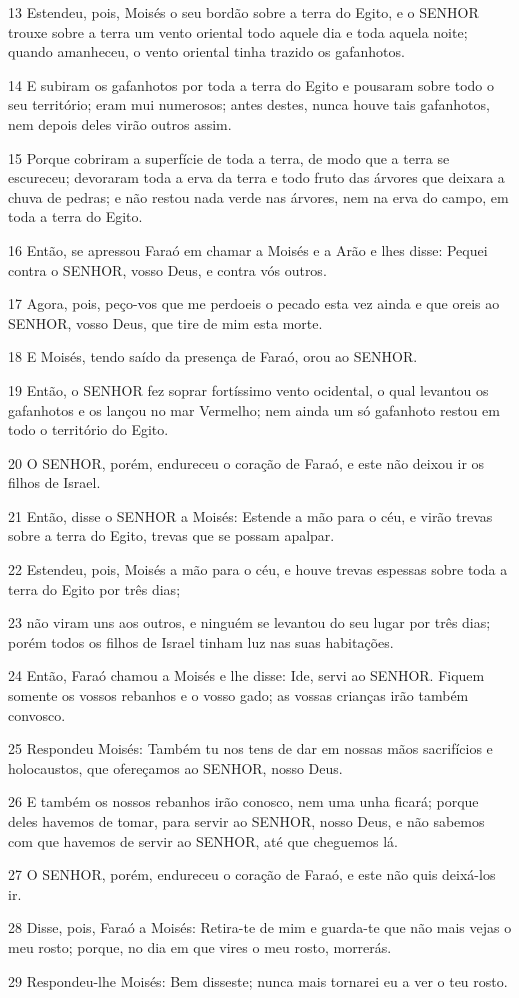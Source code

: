 \par 13 Estendeu, pois, Moisés o seu bordão sobre a terra do Egito, e o SENHOR trouxe sobre a terra um vento oriental todo aquele dia e toda aquela noite; quando amanheceu, o vento oriental tinha trazido os gafanhotos.
\par 14 E subiram os gafanhotos por toda a terra do Egito e pousaram sobre todo o seu território; eram mui numerosos; antes destes, nunca houve tais gafanhotos, nem depois deles virão outros assim.
\par 15 Porque cobriram a superfície de toda a terra, de modo que a terra se escureceu; devoraram toda a erva da terra e todo fruto das árvores que deixara a chuva de pedras; e não restou nada verde nas árvores, nem na erva do campo, em toda a terra do Egito.
\par 16 Então, se apressou Faraó em chamar a Moisés e a Arão e lhes disse: Pequei contra o SENHOR, vosso Deus, e contra vós outros.
\par 17 Agora, pois, peço-vos que me perdoeis o pecado esta vez ainda e que oreis ao SENHOR, vosso Deus, que tire de mim esta morte.
\par 18 E Moisés, tendo saído da presença de Faraó, orou ao SENHOR.
\par 19 Então, o SENHOR fez soprar fortíssimo vento ocidental, o qual levantou os gafanhotos e os lançou no mar Vermelho; nem ainda um só gafanhoto restou em todo o território do Egito.
\par 20 O SENHOR, porém, endureceu o coração de Faraó, e este não deixou ir os filhos de Israel.
\par 21 Então, disse o SENHOR a Moisés: Estende a mão para o céu, e virão trevas sobre a terra do Egito, trevas que se possam apalpar.
\par 22 Estendeu, pois, Moisés a mão para o céu, e houve trevas espessas sobre toda a terra do Egito por três dias;
\par 23 não viram uns aos outros, e ninguém se levantou do seu lugar por três dias; porém todos os filhos de Israel tinham luz nas suas habitações.
\par 24 Então, Faraó chamou a Moisés e lhe disse: Ide, servi ao SENHOR. Fiquem somente os vossos rebanhos e o vosso gado; as vossas crianças irão também convosco.
\par 25 Respondeu Moisés: Também tu nos tens de dar em nossas mãos sacrifícios e holocaustos, que ofereçamos ao SENHOR, nosso Deus.
\par 26 E também os nossos rebanhos irão conosco, nem uma unha ficará; porque deles havemos de tomar, para servir ao SENHOR, nosso Deus, e não sabemos com que havemos de servir ao SENHOR, até que cheguemos lá.
\par 27 O SENHOR, porém, endureceu o coração de Faraó, e este não quis deixá-los ir.
\par 28 Disse, pois, Faraó a Moisés: Retira-te de mim e guarda-te que não mais vejas o meu rosto; porque, no dia em que vires o meu rosto, morrerás.
\par 29 Respondeu-lhe Moisés: Bem disseste; nunca mais tornarei eu a ver o teu rosto.


